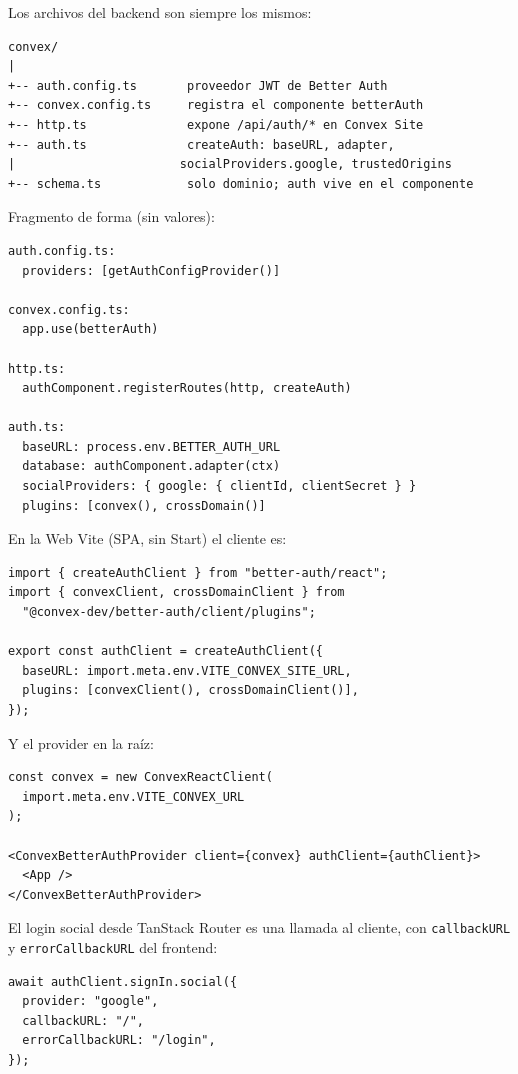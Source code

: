 \documentclass[11pt,a4paper]{article}
\begin{document}
Los archivos del backend son siempre los mismos:

\begin{lstlisting}
convex/
|
+-- auth.config.ts       proveedor JWT de Better Auth
+-- convex.config.ts     registra el componente betterAuth
+-- http.ts              expone /api/auth/* en Convex Site
+-- auth.ts              createAuth: baseURL, adapter,
|                       socialProviders.google, trustedOrigins
+-- schema.ts            solo dominio; auth vive en el componente
\end{lstlisting}

Fragmento de forma (sin valores):

\begin{lstlisting}
auth.config.ts:
  providers: [getAuthConfigProvider()]

convex.config.ts:
  app.use(betterAuth)

http.ts:
  authComponent.registerRoutes(http, createAuth)

auth.ts:
  baseURL: process.env.BETTER_AUTH_URL
  database: authComponent.adapter(ctx)
  socialProviders: { google: { clientId, clientSecret } }
  plugins: [convex(), crossDomain()]
\end{lstlisting}

En la Web Vite (SPA, sin Start) el cliente es:

\begin{lstlisting}
import { createAuthClient } from "better-auth/react";
import { convexClient, crossDomainClient } from
  "@convex-dev/better-auth/client/plugins";

export const authClient = createAuthClient({
  baseURL: import.meta.env.VITE_CONVEX_SITE_URL,
  plugins: [convexClient(), crossDomainClient()],
});
\end{lstlisting}

Y el provider en la raíz:

\begin{lstlisting}
const convex = new ConvexReactClient(
  import.meta.env.VITE_CONVEX_URL
);

<ConvexBetterAuthProvider client={convex} authClient={authClient}>
  <App />
</ConvexBetterAuthProvider>
\end{lstlisting}

El login social desde TanStack Router es una llamada al cliente, con
\texttt{callbackURL} y \texttt{errorCallbackURL} del frontend:

\begin{lstlisting}
await authClient.signIn.social({
  provider: "google",
  callbackURL: "/",
  errorCallbackURL: "/login",
});
\end{lstlisting}
\end{document}
